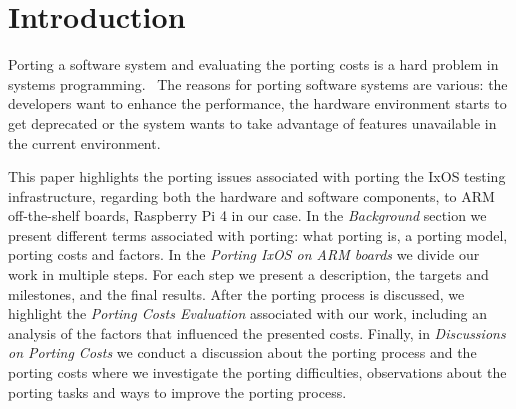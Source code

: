 \section{Introduction}

Porting a software system and evaluating the porting costs is a hard problem in
systems programming.~\cite{b1,b2,b4,b5,b9,b10,b11,b12,b13,b14,b15,b16} The
reasons for porting software systems are various: the developers want to enhance
the performance, the hardware environment starts to get deprecated or the system
wants to take advantage of features unavailable in the current environment.

This paper highlights the porting issues associated with porting the IxOS
testing infrastructure, regarding both the hardware and software components, to
ARM off-the-shelf boards, Raspberry Pi 4 in our case. In the \textit{Background}
section we present different terms associated with porting: what porting is, a
porting model, porting costs and factors. In the \textit{Porting IxOS on ARM
boards} we divide our work in multiple steps. For each step we present a
description, the targets and milestones, and the final results.  After the
porting process is discussed, we highlight the \textit{Porting Costs Evaluation}
associated with our work, including an analysis of the factors that influenced
the presented costs.  Finally, in \textit{Discussions on Porting Costs} we
conduct a discussion about the porting process and the porting costs where we
investigate the porting difficulties, observations about the porting tasks and
ways to improve the porting process. 
